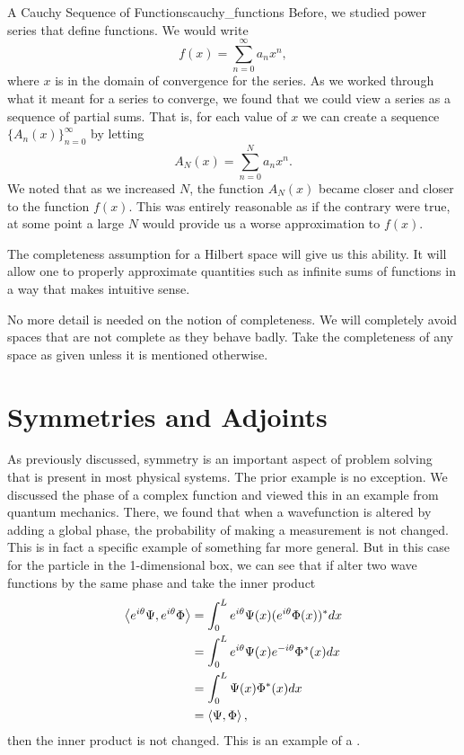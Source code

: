 \begin{ex}{A Cauchy Sequence of Functions}{cauchy_functions}
	Before, we studied power series that define functions.  We would write
	\[
		f(x) = \sum_{n=0}^\infty a_n x^n,
	\]
	where $x$ is in the domain of convergence for the series.  As we worked through what it meant for a series to converge, we found that we could view a series as a sequence of partial sums.  That is, for each value of $x$ we can create a sequence $\{A_n(x)\}_{n=0}^\infty$ by letting
	\[
		A_N(x) = \sum_{n=0}^N a_n x^n.
	\]
	We noted that as we increased $N$, the function $A_N(x)$ became closer and closer to the function $f(x)$.  This was entirely reasonable as if the contrary were true, at some point a large $N$ would provide us a worse approximation to $f(x)$.  

	The completeness assumption for a Hilbert space will give us this ability.  It will allow one to properly approximate quantities such as infinite sums of functions in a way that makes intuitive sense.  
\end{ex}

No more detail is needed on the notion of completeness. We will completely avoid spaces that are not complete as they behave badly.  Take the completeness of any space as given unless it is mentioned otherwise. 

\section{Symmetries and Adjoints}

As previously discussed, symmetry is an important aspect of problem solving that is present in most physical systems.  The prior example is no exception.  We discussed the phase of a complex function and viewed this in an example from quantum mechanics.  There, we found that when a wavefunction is altered by adding a global phase, the probability of making a measurement is not changed.  This is in fact a specific example of something far more general.  But in this case for the particle in the 1-dimensional box, we can see that if alter two wave functions by the same phase and take the inner product
\begin{align*}
\left\langle e^{i\theta} \Psi, e^{i\theta}\Phi \right\rangle &= \int_0^L e^{i\theta} \Psi(x) (e^{i\theta}\Phi(x))^*dx \\
	&= \int_0^L e^{i\theta}\Psi(x)e^{-i\theta}\Phi^*(x)dx\\
	&= \int_0^L \Psi(x)\Phi^*(x)dx\\
	&= \left\langle \Psi, \Phi \right\rangle,
\end{align*}
then the inner product is not changed.  This is an example of a .  

